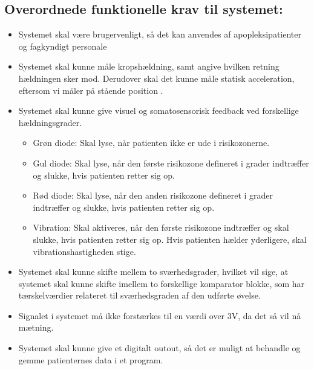 \subsection{Overordnede funktionelle krav til systemet:}
\begin{itemize}
	\item Systemet skal være brugervenligt, så det kan anvendes af apopleksipatienter og fagkyndigt personale
	\item Systemet skal kunne måle kropshældning, samt angive hvilken retning hældningen sker mod. Derudover skal det kunne måle statisk acceleration, eftersom vi måler på stående position .
	\item Systemet skal kunne give visuel og somatosensorisk feedback ved forskellige hældningsgrader.
	\begin{itemize}
		\item Grøn diode: Skal lyse, når patienten ikke er ude i risikozonerne.  
		\item Gul diode: Skal lyse, når den første risikozone defineret i grader indtræffer og slukke, hvis patienten retter sig op.
		\item Rød diode: Skal lyse, når den anden risikozone defineret i grader indtræffer og slukke, hvis patienten retter sig op.
		\item Vibration: Skal aktiveres, når den første risikozone indtræffer og skal slukke, hvis patienten retter sig op. Hvis patienten hælder yderligere, skal vibrationshastigheden stige.
	\end{itemize}
	\item Systemet skal kunne skifte mellem to sværhedsgrader, hvilket vil sige, at systemet skal kunne skifte imellem to forskellige komparator blokke, som har tærskelværdier relateret til sværhedsgraden af den udførte øvelse.
	\item Signalet i systemet må ikke forstærkes til en værdi over 3V, da det så vil nå mætning.
	\item Systemet skal kunne give et digitalt outout, så det er muligt at behandle og gemme patienternes data i et program.
\end{itemize}

